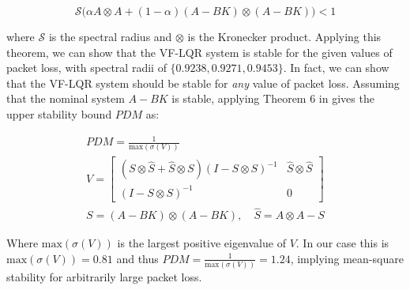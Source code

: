 \begin{equation}\label{eq:HuStabCondition}
	\mathcal{S}\Big(\alpha A \otimes A + (1-\alpha)(A-BK) \otimes (A-BK) \Big) < 1
\end{equation}

where $\mathcal{S}$ is the spectral radius and $\otimes$ is the Kronecker product. Applying this theorem, we can show that the VF-LQR system is stable for the given values of packet loss, with spectral radii of $\{0.9238,0.9271,0.9453\}$. In fact, we can show that the VF-LQR system should be stable for \textit{any} value of packet loss. Assuming that the nominal system $A-BK$ is stable, applying Theorem 6 in \cite{Hu2007} gives the upper stability bound $PDM$ as: 

\begin{equation}\label{eq:VMatrix}
	\begin{gathered}
		PDM = \frac{1}{\text{max}(\sigma(V))} \\
		V = \begin{bmatrix} (S\otimes\hat{S}+\hat{S} \otimes S)(I - S\otimes S)^{-1} & \hat{S}\otimes\hat{S} \\ (I - S\otimes S)^{-1} & 0 \end{bmatrix} \\
		S = \left(A-BK\right) \otimes \left(A-BK\right), \quad \hat{S} = A \otimes A - S
	\end{gathered}
\end{equation}

Where $\text{max}(\sigma(V))$ is the largest positive eigenvalue of $V$. In our case this is $\text{max}(\sigma(V)) = 0.81$ and thus $PDM = \frac{1}{\text{max}(\sigma(V))} = 1.24$, implying mean-square stability for arbitrarily large packet loss.




